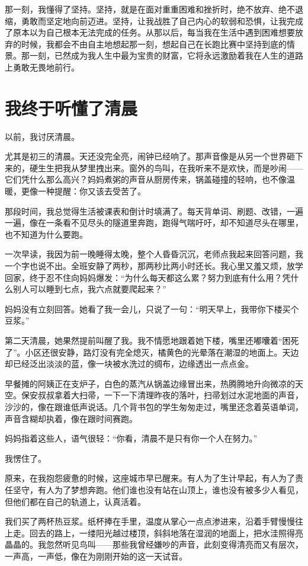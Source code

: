 那一刻，我懂得了坚持。坚持，就是在面对重重困难和挫折时，绝不放弃、绝不退缩，勇敢而坚定地向前迈进。坚持，让我战胜了自己内心的软弱和恐惧，让我完成了原本以为自己根本无法完成的任务。从那以后，每当我在生活中遇到困难想要放弃的时候，我都会不由自主地想起那一刻，想起自己在长跑比赛中坚持到底的情景。那一刻，已然成为我人生中最为宝贵的财富，它将永远激励着我在人生的道路上勇敢无畏地前行。

\section{我终于听懂了清晨}

以前，我讨厌清晨。

尤其是初三的清晨。天还没完全亮，闹钟已经响了。那声音像是从另一个世界砸下来的，硬生生把我从梦里拽出来。窗外的鸟叫，在我听来不是欢快，而是吵闹——它们凭什么那么高兴？妈妈煮粥的声音从厨房传来，锅盖碰撞的轻响，也不像温暖，更像一种提醒：你又该去受苦了。

那段时间，我总觉得生活被课表和倒计时填满了。每天背单词、刷题、改错，一遍一遍，像在一条看不见尽头的隧道里奔跑，跑得气喘吁吁，却不知道尽头在哪里，也不知道为什么要跑。

一次早读，我因为前一晚睡得太晚，整个人昏昏沉沉，老师点我起来回答问题，我一个字也说不出。全班安静了两秒，那两秒比两小时还长。我心里又羞又烦，放学回家，终于忍不住向妈妈爆发：“为什么每天都这么累？努力到底有什么用？凭什么别人可以睡到七点，我六点就要爬起来？”

妈妈没有立刻回答。她看了我一会儿，只说了一句：“明天早上，我带你下楼买个豆浆。”

第二天清晨，她果然提前叫醒了我。我不情愿地跟着她下楼，嘴里还嘟囔着“困死了”。小区还很安静，路灯没有完全熄灭，橘黄色的光晕落在潮湿的地面上。天边却已经泛出淡淡的蓝，像一块被水洗过的绸布，边缘透出一点点金。

早餐摊的阿姨正在支炉子，白色的蒸汽从锅盖边缘冒出来，热腾腾地升向微凉的天空。保安叔叔拿着大扫帚，一下一下清理昨夜的落叶，扫帚划过水泥地面的声音，沙沙的，像在跟谁低声说话。几个背书包的学生匆匆走过，嘴里还念着英语单词，声音含糊却执着，像在跟时间赛跑。

妈妈指着这些人，语气很轻：“你看，清晨不是只有你一个人在努力。”

我愣住了。

原来，在我抱怨疲惫的时候，这座城市早已醒来。有人为了生计早起，有人为了责任坚守，有人为了梦想奔跑。他们谁也没有站在山顶上，谁也没有被多少人看见，但他们都在自己的轨道上，认真活着。

我们买了两杯热豆浆。纸杯捧在手里，温度从掌心一点点渗进来，沿着手臂慢慢往上走。回去的路上，一缕阳光越过楼顶，斜斜地落在湿润的地面上，把水洼照得亮晶晶的。我忽然听见鸟叫——那些我曾经嫌吵的声音，此刻变得清亮而又有层次，一声高，一声低，像在为刚刚开始的这一天试音。

